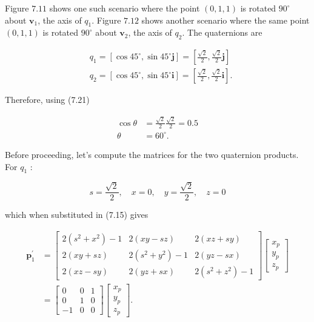 Figure $7.11$ shows one such scenario where the point $(0,1,1)$ is rotated $90^{\circ}$ about $\mathbf{v}_{1}$, the axis of $q_{1}$. Figure $7.12$ shows another scenario where the same point $(0,1,1)$ is rotated $90^{\circ}$ about $\mathbf{v}_{2}$, the axis of $q_{2}$. The quaternions are

$$
\begin{aligned}
& q_{1}=\left[\cos 45^{\circ}, \sin 45^{\circ} \mathbf{j}\right]=\left[\frac{\sqrt{2}}{2}, \frac{\sqrt{2}}{2} \mathbf{j}\right] \\
& q_{2}=\left[\cos 45^{\circ}, \sin 45^{\circ} \mathbf{i}\right]=\left[\frac{\sqrt{2}}{2}, \frac{\sqrt{2}}{2} \mathbf{i}\right] .
\end{aligned}
$$

Therefore, using (7.21)

$$
\begin{aligned}
\cos \theta & =\frac{\sqrt{2}}{2} \frac{\sqrt{2}}{2}=0.5 \\
\theta & =60^{\circ} .
\end{aligned}
$$

Before proceeding, let's compute the matrices for the two quaternion products. For $q_{1}$ :

$$
s=\frac{\sqrt{2}}{2}, \quad x=0, \quad y=\frac{\sqrt{2}}{2}, \quad z=0
$$

which when substituted in (7.15) gives

$$
\begin{aligned}
\mathbf{p}_{1}^{\prime} & =\left[\begin{array}{ccc}
2\left(s^{2}+x^{2}\right)-1 & 2(x y-s z) & 2(x z+s y) \\
2(x y+s z) & 2\left(s^{2}+y^{2}\right)-1 & 2(y z-s x) \\
2(x z-s y) & 2(y z+s x) & 2\left(s^{2}+z^{2}\right)-1
\end{array}\right]\left[\begin{array}{l}
x_{p} \\
y_{p} \\
z_{p}
\end{array}\right] \\
& =\left[\begin{array}{ccc}
0 & 0 & 1 \\
0 & 1 & 0 \\
-1 & 0 & 0
\end{array}\right]\left[\begin{array}{l}
x_{p} \\
y_{p} \\
z_{p}
\end{array}\right] .
\end{aligned}
$$

